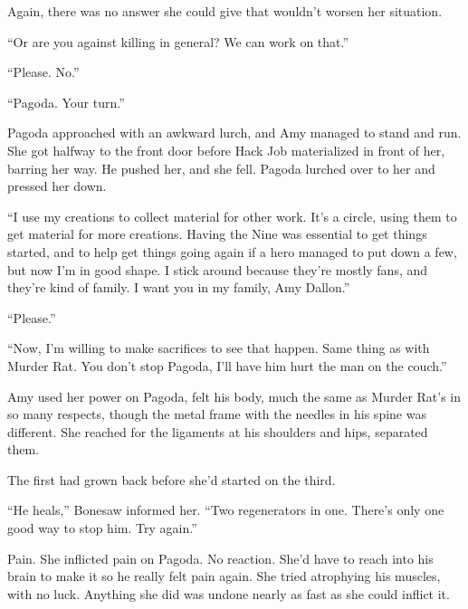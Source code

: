 Again, there was no answer she could give that wouldn't worsen her situation.



``Or are you against killing in general?  We can work on that.''



``Please.  No.''



``Pagoda.  Your turn.''



Pagoda approached with an awkward lurch, and Amy managed to stand and run.  She got halfway to the front door before Hack Job materialized in front of her, barring her way.  He pushed her, and she fell.  Pagoda lurched over to her and pressed her down.



``I use my creations to collect material for other work.  It's a circle, using them to get material for more creations.  Having the Nine was essential to get things started, and to help get things going again if a hero managed to put down a few, but now I'm in good shape.  I stick around because they're mostly fans, and they're kind of family.  I want you in my family, Amy Dallon.''



``Please.''



``Now, I'm willing to make sacrifices to see that happen.  Same thing as with Murder Rat.  You don't stop Pagoda, I'll have him hurt the man on the couch.''



Amy used her power on Pagoda, felt his body, much the same as Murder Rat's in so many respects, though the metal frame with the needles in his spine was different.  She reached for the ligaments at his shoulders and hips, separated them.



The first had grown back before she'd started on the third.



``He heals,'' Bonesaw informed her.  ``Two regenerators in one.  There's only one good way to stop him.  Try again.''



Pain.  She inflicted pain on Pagoda.  No reaction.  She'd have to reach into his brain to make it so he really felt pain again.  She tried atrophying his muscles, with no luck.  Anything she did was undone nearly as fast as she could inflict it.




